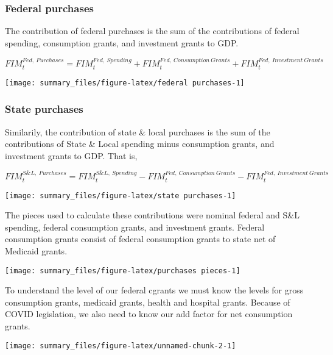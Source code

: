 \documentclass[
]{article}
\begin{document}
\hypertarget{federal-purchases}{%
\subsubsection{Federal purchases}\label{federal-purchases}}

The contribution of federal purchases is the sum of the contributions of
federal spending, consumption grants, and investment grants to GDP.

\[FIM^{Fed,\ Purchases}_{t} = FIM^{Fed,\ Spending}_{t} + FIM^{Fed, \ Consumption\ Grants}_{t} + FIM^{Fed, \ Investment\ Grants}_{t} \]

\begin{center}\texttt{[image: summary\_files/figure-latex/federal purchases-1]} \end{center}

\hypertarget{state-purchases}{%
\subsubsection{State purchases}\label{state-purchases}}

Similarily, the contribution of state \& local purchases is the sum of
the contributions of State \& Local spending minus consumption grants,
and investment grants to GDP. That is,

\[FIM^{S\&L,\  Purchases}_{t} = FIM^{S\&L,\ Spending}_{t} - FIM^{Fed,\ Consumption\ Grants}_{t} - FIM^{Fed,\ Investment\ Grants}_{t} \]

\begin{center}\texttt{[image: summary\_files/figure-latex/state purchases-1]} \end{center}

The pieces used to calculate these contributions were nominal federal
and S\&L spending, federal consumption grants, and investment grants.
Federal consumption grants consist of federal consumption grants to
state net of Medicaid grants.

\begin{center}\texttt{[image: summary\_files/figure-latex/purchases pieces-1]} \end{center}

To understand the level of our federal cgrants we must know the levels
for gross consumption grants, medicaid grants, health and hospital
grants. Because of COVID legislation, we also need to know our add
factor for net consumption grants.

\begin{center}\texttt{[image: summary\_files/figure-latex/unnamed-chunk-2-1]} \end{center}
\end{document}
